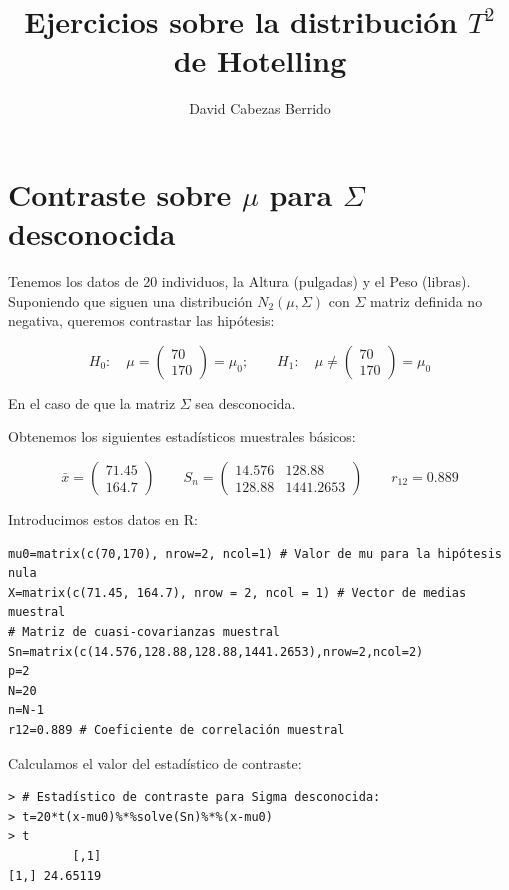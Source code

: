 \documentclass[12pt]{article}
\title{Ejercicios sobre la distribución $T^2$ de Hotelling}
\author{David Cabezas Berrido}
\date{}
\begin{document}
\maketitle

\section{Contraste sobre $\mu$ para $\Sigma$ desconocida}

Tenemos los datos de 20 individuos, la Altura (pulgadas) y el Peso
(libras). Suponiendo que siguen una distribución $N_2(\mu,\Sigma)$ con
$\Sigma$ matriz definida no negativa, queremos contrastar las
hipótesis:

\[H_0:\quad \mu=
  \begin{pmatrix}
    70 \\ 170
  \end{pmatrix}=\mu_0;\qquad H_1:\quad \mu\neq \begin{pmatrix}
    70 \\ 170
  \end{pmatrix}=\mu_0
\]

En el caso de que la matriz $\Sigma$ sea desconocida.

Obtenemos los siguientes estadísticos muestrales básicos:

\[\bar{x}=
  \begin{pmatrix}
    71.45 \\ 164.7
  \end{pmatrix} \qquad S_n=
  \begin{pmatrix}
    14.576 & 128.88 \\ 128.88 & 1441.2653
  \end{pmatrix} \qquad r_{12}=0.889\]

Introducimos estos datos en R:
\begin{verbatim}
mu0=matrix(c(70,170), nrow=2, ncol=1) # Valor de mu para la hipótesis nula
X=matrix(c(71.45, 164.7), nrow = 2, ncol = 1) # Vector de medias muestral
# Matriz de cuasi-covarianzas muestral
Sn=matrix(c(14.576,128.88,128.88,1441.2653),nrow=2,ncol=2)
p=2
N=20
n=N-1
r12=0.889 # Coeficiente de correlación muestral
\end{verbatim}

Calculamos el valor del estadístico de contraste:

\begin{verbatim}
> # Estadístico de contraste para Sigma desconocida:
> t=20*t(x-mu0)%*%solve(Sn)%*%(x-mu0)
> t
         [,1]
[1,] 24.65119
\end{verbatim}
\end{document}
